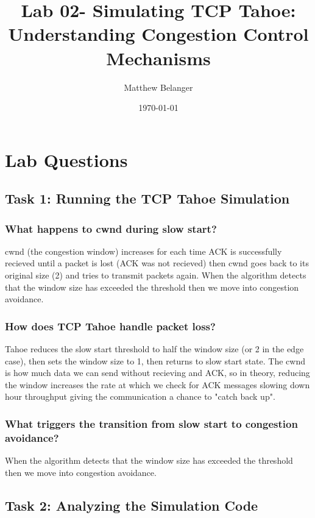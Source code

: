 \documentclass{article}
\title{Lab 02- Simulating TCP Tahoe: Understanding Congestion Control Mechanisms}
\author{Matthew Belanger}
\date{\today}
\begin{document}
\maketitle


\section{Lab Questions}


\subsection{Task 1: Running the TCP Tahoe Simulation}

\subsubsection{What happens to cwnd during slow start?}

cwnd (the congestion window) increases for each time ACK is successfully recieved until a packet is lost (ACK was not recieved)
then cwnd goes back to its original size (2) and tries to transmit packets again. When the algorithm detects that the window size has exceeded the threshold
then we move into congestion avoidance.

\subsubsection{How does TCP Tahoe handle packet loss?}
Tahoe reduces the slow start threshold to half the window size (or 2 in the edge case), 
then sets the window size to 1, then returns to slow start state. The cwnd is how much data we can send without recieving and ACK,
so in theory, reducing the window increases the rate at which we check for ACK messages slowing down hour throughput giving the communication a 
chance to "catch back up".

\subsubsection{What triggers the transition from slow start to congestion avoidance?}
When the algorithm detects that the window size has exceeded the threshold then we move into congestion avoidance.


\subsection{Task 2: Analyzing the Simulation Code}
\end{document}
